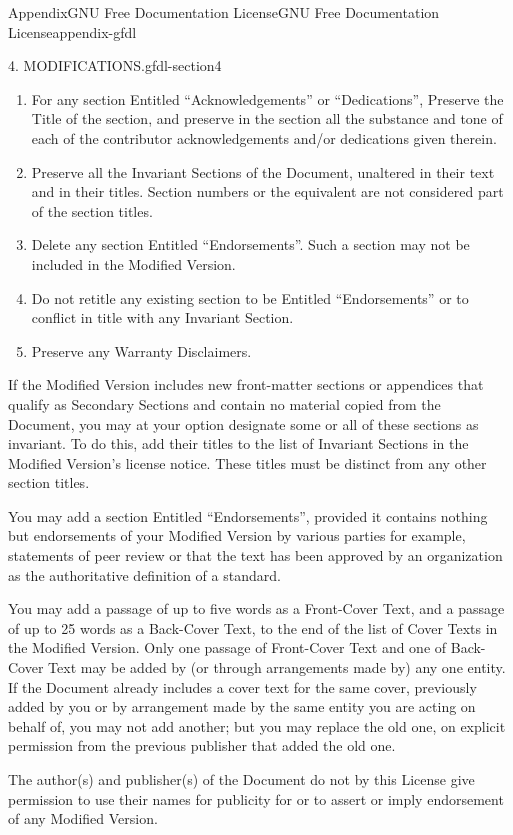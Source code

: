 \documentclass[oneside,10pt,]{book}
\numberwithin{equation}{section}
\begin{document}
\begin{appendixptx}{Appendix}{GNU Free Documentation License}{}{GNU Free Documentation License}{}{}{appendix-gfdl}
\begin{paragraphs}{4. MODIFICATIONS.}{gfdl-section4}
\begin{enumerate}[label={\Alph*.}]
\item{}For any section Entitled ``Acknowledgements'' or ``Dedications'', Preserve the Title of the section, and preserve in the section all the substance and tone of each of the contributor acknowledgements and\slash{}or dedications given therein.%
\item{}Preserve all the Invariant Sections of the Document, unaltered in their text and in their titles. Section numbers or the equivalent are not considered part of the section titles.%
\item{}Delete any section Entitled ``Endorsements''. Such a section may not be included in the Modified Version.%
\item{}Do not retitle any existing section to be Entitled ``Endorsements'' or to conflict in title with any Invariant Section.%
\item{}Preserve any Warranty Disclaimers.%
\end{enumerate}
%
\par
If the Modified Version includes new front-matter sections or appendices that qualify as Secondary Sections and contain no material copied from the Document, you may at your option designate some or all of these sections as invariant. To do this, add their titles to the list of Invariant Sections in the Modified Version's license notice. These titles must be distinct from any other section titles.%
\par
You may add a section Entitled ``Endorsements'', provided it contains nothing but endorsements of your Modified Version by various parties \textemdash{} for example, statements of peer review or that the text has been approved by an organization as the authoritative definition of a standard.%
\par
You may add a passage of up to five words as a Front-Cover Text, and a passage of up to 25 words as a Back-Cover Text, to the end of the list of Cover Texts in the Modified Version. Only one passage of Front-Cover Text and one of Back-Cover Text may be added by (or through arrangements made by) any one entity. If the Document already includes a cover text for the same cover, previously added by you or by arrangement made by the same entity you are acting on behalf of, you may not add another; but you may replace the old one, on explicit permission from the previous publisher that added the old one.%
\par
The author(s) and publisher(s) of the Document do not by this License give permission to use their names for publicity for or to assert or imply endorsement of any Modified Version.%

\end{paragraphs}
\end{appendixptx}
\end{document}
